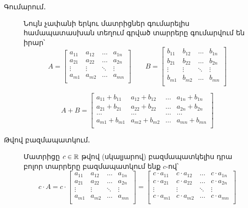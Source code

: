 \begin{description}
\item[Գումարում․]  Նույն չափանի երկու մատրիցներ գումարելիս համապա\-տաս\-խան տեղում գրված տարրերը գումարվում են իրար՝
\[
  A = \begin{bmatrix}
    a_{11} & a_{12} & \ldots & a_{1n} \\
    a_{21} & a_{22} & \ldots & a_{2n} \\
    \vdots & \vdots & \ddots & \vdots \\
    a_{m1} & a_{m2} & \ldots & a_{mn} \\
  \end{bmatrix}
  \qquad
  B = \begin{bmatrix}
    b_{11} & b_{12} & \ldots & b_{1n} \\
    b_{21} & b_{22} & \ldots & b_{2n} \\
    \vdots & \vdots & \ddots & \vdots \\
    b_{m1} & b_{m2} & \ldots & b_{mn} \\
  \end{bmatrix}
\]

\[
  A + B = \begin{bmatrix}
    a_{11} + b_{11} & a_{12} + b_{12} & \ldots & a_{1n} + b_{1n} \\
    a_{21} + b_{21} & a_{22} + b_{22} & \ldots & a_{2n} + b_{2n} \\
    \ldots & \ldots & \ldots & \ldots \\
    a_{m1} + b_{m1} & a_{m2} + b_{m2} & \ldots & a_{mn} + b_{mn} \\
  \end{bmatrix}
\]

\item[Թվով բազմապատկում․] Մատրիցը $c \in \mathbb{R}$ թվով (սկալյարով) բազմա\-պատ\-կելիս դրա բոլոր տարրերը բազմապատկում ենք $c$-ով՝
\[
  c \cdot A = c \cdot \begin{bmatrix}
    a_{11} & a_{12} & \ldots & a_{1n} \\
    a_{21} & a_{22} & \ldots & a_{2n} \\
    \vdots & \vdots & \ddots & \vdots \\
    a_{m1} & a_{m2} & \ldots & a_{mn} \\
  \end{bmatrix}= \begin{bmatrix}
    c \cdot a_{11} & c \cdot a_{12} & \ldots & c \cdot a_{1n} \\
    c \cdot a_{21} & c \cdot a_{22} & \ldots & c \cdot a_{2n} \\
    \vdots & \vdots & \ddots & \vdots \\
    c \cdot a_{m1} & c \cdot a_{m2} & \ldots & c \cdot a_{mn} \\
  \end{bmatrix}
\]



\end{description}
